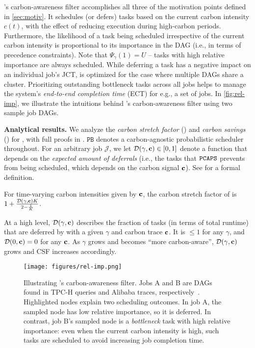 \noindent
\PCAPS's carbon-awareness filter accomplishes all three of the motivation points defined in \autoref{sec:motiv}.
It schedules (or defers) tasks based on the current carbon intensity $c(t)$, with the effect of reducing execution during high-carbon periods.  Furthermore, the likelihood of a task being scheduled irrespective of the current carbon intensity is proportional to its importance in the DAG (i.e., in terms of precedence constraints).
Note that $\Psi_\gamma(1) = U$ -- tasks with high relative importance are always scheduled.  
While deferring a task has a negative impact on an individual job's JCT, \PCAPS is optimized for the case where multiple DAGs share a cluster.  Prioritizing outstanding bottleneck tasks across all jobs helps to manage the system's \textit{end-to-end completion time} (ECT) for e.g., a set of jobs.
In \autoref{fig:rel-imp}, we illustrate the intuitions behind \PCAPS's carbon-awareness filter using two sample job DAGs. 

\noindent\textbf{Analytical results. }
We analyze the \textit{carbon stretch factor} () and \textit{carbon savings} () for \PCAPS, with full proofs in .  $\texttt{PB}$ denotes a carbon-agnostic probabilistic scheduler throughout.
For an arbitrary job $\mathcal{J}$, we let $\mathcal{D}(\gamma, {\mathbf{c}}) \in [0,1]$ denote a function that depends on the \textit{expected amount of deferrals}
(i.e., the tasks that $\texttt{PCAPS}$ prevents from being scheduled, which depends on the carbon signal ${\mathbf{c}}$).  See  for a formal definition.
\begin{thm}\label{thm:danishMakespan}
    For time-varying carbon intensities given by ${\mathbf{c}}$, the carbon stretch factor of \PCAPS is $1 + \frac{\mathcal{D}(\gamma, {\mathbf{c}}) K}{2 - \frac{1}{K}}$.
\end{thm}
\noindent At a high level, $\mathcal{D}(\gamma, {\mathbf{c}})$ describes the fraction of tasks (in terms of total runtime) that are deferred by \PCAPS with a given $\gamma$ and carbon trace ${\mathbf{c}}$.  It is $\leq 1$ for any $\gamma$, and $\mathcal{D}(0, {\mathbf{c}}) = 0$ for any ${\mathbf{c}}$.  As $\gamma$ grows and \PCAPS becomes ``more carbon-aware'',  $\mathcal{D}(\gamma, {\mathbf{c}})$ grows and CSF increases accordingly.


\begin{figure}[t]
    \centering 
    \texttt{[image: figures/rel-imp.png]} \vspace{-2em}
    \caption{Illustrating \PCAPS's carbon-awareness filter.  Jobs A and B are  DAGs found in TPC-H queries and Alibaba traces, respectively~\cite{TPCH:18, Alibaba:18}.  Highlighted nodes explain two scheduling outcomes.  In job A, the sampled node has low relative importance, so it is deferred.  In contrast, job B's sampled node is a \textit{bottleneck} task with high relative importance: even when the current carbon intensity is high, such tasks are scheduled to avoid increasing job completion time.}
    \label{fig:rel-imp} \vspace{-1em}
\end{figure}







